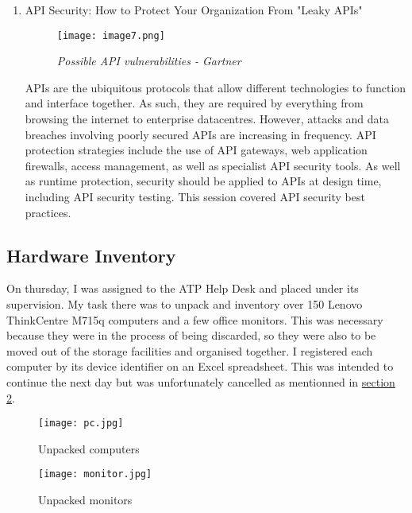 \begin{enumerate}
    \item \color{dgreen} API Security: How to Protect Your Organization From "Leaky APIs"
    
    \begin{figure}[H]
        \centering
            \texttt{[image: image7.png]}
            \caption*{\textit{Possible API vulnerabilities - Gartner}}
    \end{figure}

    \color{black} APIs are the ubiquitous protocols that allow different technologies to function and interface together. As such, they are required by everything from browsing the internet to enterprise datacentres. However, attacks and data breaches involving poorly secured APIs are increasing in frequency. API protection strategies include the use of API gateways, web application firewalls, access management, as well as specialist API security tools. As well as runtime protection, security should be applied to APIs at design time, including API security testing. This session covered API security best practices.
\end{enumerate}

\subsection{Hardware Inventory}

On thursday, I was assigned to the ATP Help Desk and placed under its supervision. My task there was to unpack and inventory over 150 Lenovo ThinkCentre M715q computers and a few office monitors. This was necessary because they were in the process of being discarded, so they were also to be moved out of the storage facilities and organised together.  I registered each computer by its device identifier on an Excel spreadsheet.\cite{pc_excel} This was intended to continue the next day but was unfortunately cancelled as mentionned in \hyperlink{section.2}{section 2}.

\begin{figure}[H]
    \centering
    \begin{minipage}[b]{0.49\textwidth}
      \texttt{[image: pc.jpg]}
      \caption*{Unpacked computers}
    \end{minipage}
    \hfill
    \begin{minipage}[b]{0.49\textwidth}
      \texttt{[image: monitor.jpg]}
      \caption*{Unpacked monitors}
    \end{minipage}
\end{figure}

